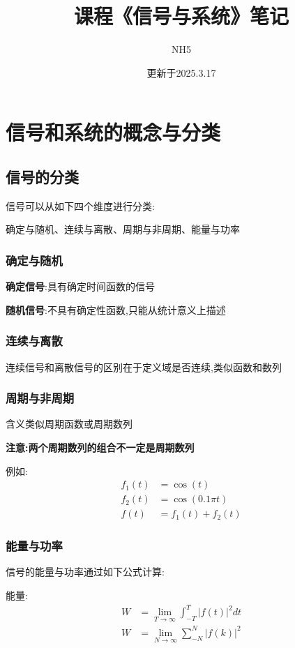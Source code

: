 \documentclass[12pt, a4paper, oneside]{ctexart}
\title{课程《信号与系统》笔记}
\author{NH5}
\date{更新于2025.3.17}
\begin{document}
\maketitle

\section{信号和系统的概念与分类}
\subsection{信号的分类}
信号可以从如下四个维度进行分类:

确定与随机、连续与离散、周期与非周期、能量与功率

\subsubsection{确定与随机}
\textbf{确定信号}:具有确定时间函数的信号

\textbf{随机信号}:不具有确定性函数,只能从统计意义上描述

\subsubsection{连续与离散}
连续信号和离散信号的区别在于定义域是否连续,类似函数和数列

\subsubsection{周期与非周期}
含义类似周期函数或周期数列

\textbf{注意:两个周期数列的组合不一定是周期数列}

例如:
\begin{align*}
    f_1(t) &= \cos (t)\\
    f_2(t) &= \cos (0.1 \pi t)\\
    f(t) &= f_1(t) + f_2(t)
\end{align*}

\subsubsection{能量与功率}
信号的能量与功率通过如下公式计算:

能量:
\begin{align*}
    W &= \lim_{T \to \infty}\int_{-T}^{T} |f(t)|^2 dt\\
    W &= \lim_{N \to \infty}\sum_{-N}^{N}|f(k)|^2
\end{align*}
\end{document}
